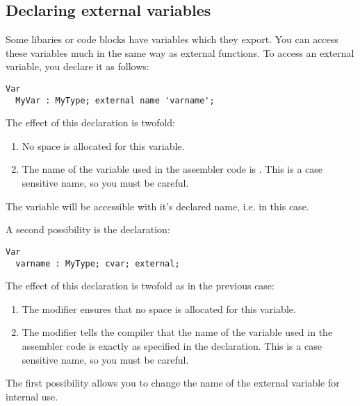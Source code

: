 \subsection{Declaring external variables}
\label{se:ExternalVars}

Some libaries or code blocks have variables which they export. You can access
these variables much in the same way as external functions. To access an
external variable, you declare it as follows:

\begin{verbatim}
Var
  MyVar : MyType; external name 'varname';
\end{verbatim}
The effect of this declaration is twofold:
\begin{enumerate}
\item No space is allocated for this variable.
\item The name of the variable used in the assembler code is .
This is a case sensitive name, so you must be careful.
\end{enumerate}
The variable will be
accessible with it's declared name, i.e.  in this case.

A second possibility is the declaration:
\begin{verbatim}
Var
  varname : MyType; cvar; external;
\end{verbatim}
The effect of this declaration is twofold as in the previous case:
\begin{enumerate}
\item The  modifier ensures that no space is allocated for
this variable.
\item The  modifier tells the compiler that the name of the
variable used in the assembler code is exactly as specified in the
declaration. This is a case sensitive name, so you must be careful.
\end{enumerate}
The first possibility allows you to change the name of the
external variable for  internal use.

